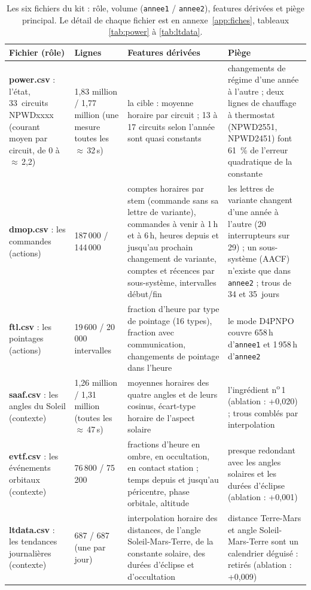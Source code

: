 \documentclass[11pt,a4paper]{article}
\begin{document}
\begin{table}[htbp]
\centering\footnotesize
\caption{Les six fichiers du kit : rôle, volume (\texttt{annee1} / \texttt{annee2}), features dérivées et piège principal. Le détail de chaque fichier est en annexe~\ref{app:fiches}, tableaux \ref{tab:power} à \ref{tab:ltdata}.}
\label{tab:kit}
\begin{tabularx}{\textwidth}{L{2.7cm} L{2.4cm} Y Y}
\toprule
Fichier (rôle) & Lignes & Features dérivées & Piège \\
\midrule
\textbf{power.csv} : l'état, 33~circuits NPWDxxxx (courant moyen par circuit, de 0 à $\approx$\,2,2) & 1,83 million / 1,77 million (une mesure toutes les $\approx$\,32\,s) & la cible : moyenne horaire par circuit ; 13 à 17 circuits selon l'année sont quasi constants & changements de régime d'une année à l'autre ; deux lignes de chauffage à thermostat (NPWD2551, NPWD2451) font 61~\% de l'erreur quadratique de la constante \\
\textbf{dmop.csv} : les commandes (actions) & 187\,000 / 144\,000 & comptes horaires par stem (commande sans sa lettre de variante), commandes à venir à 1\,h et à 6\,h, heures depuis et jusqu'au prochain changement de variante, comptes et récences par sous-système, intervalles début/fin & les lettres de variante changent d'une année à l'autre (20 interrupteurs sur 29) ; un sous-système (AACF) n'existe que dans \texttt{annee2} ; trous de 34 et 35~jours \\
\textbf{ftl.csv} : les pointages (actions) & 19\,600 / 20\,000 intervalles & fraction d'heure par type de pointage (16 types), fraction avec communication, changements de pointage dans l'heure & le mode D4PNPO couvre 658\,h d'\texttt{annee1} et 1\,958\,h d'\texttt{annee2} \\
\textbf{saaf.csv} : les angles du Soleil (contexte) & 1,26 million / 1,31 million (toutes les $\approx$\,47\,s) & moyennes horaires des quatre angles et de leurs cosinus, écart-type horaire de l'aspect solaire & l'ingrédient n\textsuperscript{o}\,1 (ablation : +0,020) ; trous comblés par interpolation \\
\textbf{evtf.csv} : les événements orbitaux (contexte) & 76\,800 / 75\,200 & fractions d'heure en ombre, en occultation, en contact station ; temps depuis et jusqu'au péricentre, phase orbitale, altitude & presque redondant avec les angles solaires et les durées d'éclipse (ablation : +0,001) \\
\textbf{ltdata.csv} : les tendances journalières (contexte) & 687 / 687 (une par jour) & interpolation horaire des distances, de l'angle Soleil-Mars-Terre, de la constante solaire, des durées d'éclipse et d'occultation & distance Terre-Mars et angle Soleil-Mars-Terre sont un calendrier déguisé : retirés (ablation : +0,009) \\
\bottomrule
\end{tabularx}
\end{table}
\end{document}
